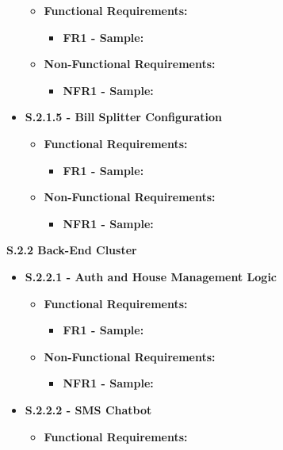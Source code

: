 \documentclass{scrreprt}
\theoremstyle{definition}
\begin{document}
\begin{flushleft}
\begin{itemize}
  	\begin{itemize}
  		\item \textbf{Functional Requirements:}
  		\begin{itemize}
  			\item \textbf{FR1 - Sample:}
  		\end{itemize}
  		\item \textbf{Non-Functional Requirements:}
  		\begin{itemize}
  			\item \textbf{NFR1 - Sample:}
  		\end{itemize}
  	\end{itemize}
  	\item \textbf{S.2.1.5 - Bill Splitter Configuration}
  	\begin{itemize}
  		\item \textbf{Functional Requirements:}
  		\begin{itemize}
  			\item \textbf{FR1 - Sample:}
  		\end{itemize}
  		\item \textbf{Non-Functional Requirements:}
  		\begin{itemize}
  			\item \textbf{NFR1 - Sample:}
  		\end{itemize}
  	\end{itemize}
  	\end{itemize}
  	\item \textbf{S.2.2 Back-End Cluster}
  \begin{itemize}
  	\item \textbf{S.2.2.1 - Auth and House Management Logic}
  	\begin{itemize}
  		\item \textbf{Functional Requirements:}
  		\begin{itemize}
  			\item \textbf{FR1 - Sample:}
  		\end{itemize}
  		\item \textbf{Non-Functional Requirements:}
  		\begin{itemize}
  			\item \textbf{NFR1 - Sample:}
  		\end{itemize}
  	\end{itemize}
  	\item \textbf{S.2.2.2 - SMS Chatbot}
  	\begin{itemize}
  		\item \textbf{Functional Requirements:}

\end{itemize}
\end{itemize}
\end{flushleft}
\end{document}
